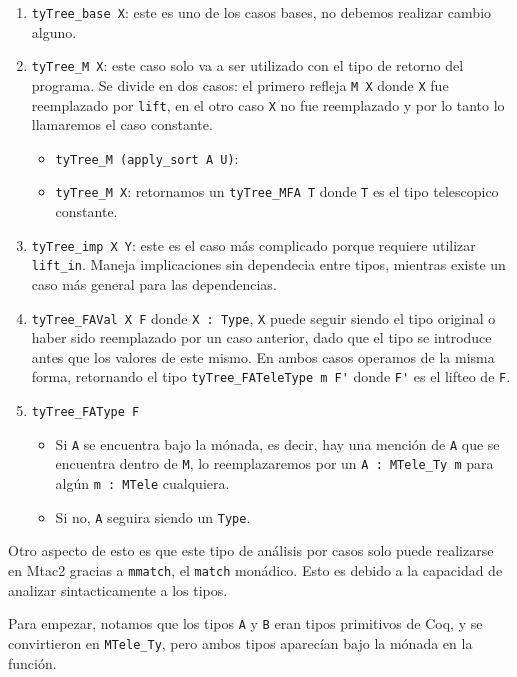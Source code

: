 \begin{enumerate}
\item \lstinline{tyTree_base X}: este es uno de los casos bases, no debemos realizar
  cambio alguno.
\item \lstinline{tyTree_M X}: este caso solo va a ser utilizado con el tipo de
  retorno del programa. Se divide en dos casos: el primero refleja \lstinline{M X}
  donde \lstinline{X} fue reemplazado por \lstinline{lift}, en el otro caso \lstinline{X} no
  fue reemplazado y por lo tanto lo llamaremos el caso constante.
  \begin{itemize}
  \item \lstinline{tyTree_M (apply_sort A U)}: 
  \item \lstinline{tyTree_M X}: retornamos un \lstinline{tyTree_MFA T} donde \lstinline{T} es
    el tipo telescopico constante.
  \end{itemize}
\item \lstinline{tyTree_imp X Y}: este es el caso más complicado porque requiere utilizar
  \lstinline{lift_in}. Maneja implicaciones sin dependecia entre tipos, mientras
  existe un caso más general para las dependencias.
\item \lstinline{tyTree_FAVal X F} donde \lstinline{X : Type}, \lstinline{X} puede seguir siendo el
  tipo original o haber sido reemplazado por un caso anterior, dado que el tipo
  se introduce antes que los valores de este mismo. En ambos casos operamos de
  la misma forma, retornando el tipo \lstinline{tyTree_FATeleType m F'} donde \lstinline{F'}
  es el lifteo de \lstinline{F}.
\item \lstinline{tyTree_FAType F}
  \begin{itemize}
  \item Si \lstinline{A} se encuentra bajo la mónada, es decir, hay una mención de
    \lstinline{A} que se encuentra dentro de \lstinline{M}, lo reemplazaremos por un
    \lstinline{A : MTele_Ty m} para algún \lstinline{m : MTele} cualquiera.
  \item Si no, \lstinline{A} seguira siendo un \lstinline{Type}.
  \end{itemize}
\end{enumerate}

Otro aspecto de esto es que este tipo de análisis por casos solo puede
realizarse en Mtac2 gracias a \lstinline{mmatch}, el \lstinline{match} monádico. Esto es
debido a la capacidad de analizar sintacticamente a los tipos.

Para empezar, notamos que los tipos \lstinline{A} y \lstinline{B} eran tipos primitivos de
Coq, y se convirtieron en \lstinline{MTele_Ty}, pero ambos tipos aparecían bajo la
mónada en la función.